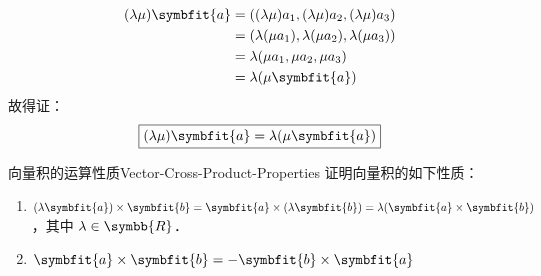 \begin{myproof}

    \begin{equation}
        \begin{aligned}
            (\lambda\mu)\symbfit{a} & = ((\lambda\mu)a_1, (\lambda\mu)a_2, (\lambda\mu)a_3)    \\
                                    & = (\lambda(\mu a_1), \lambda(\mu a_2), \lambda(\mu a_3)) \\
                                    & = \lambda(\mu a_1, \mu a_2, \mu a_3)                     \\
                                    & = \lambda(\mu\symbfit{a})
        \end{aligned}
    \end{equation}
    故得证：
    \begin{equation}
        \boxed{(\lambda\mu)\symbfit{a} = \lambda(\mu\symbfit{a})}
    \end{equation}
\end{myproof}


\begin{problem}{向量积的运算性质}{Vector-Cross-Product-Properties}
    证明向量积的如下性质：
    \begin{enumerate}
        \item $(\lambda\symbfit{a}) \times \symbfit{b} = \symbfit{a} \times (\lambda\symbfit{b}) = \lambda(\symbfit{a} \times \symbfit{b})$，其中 $\lambda \in \symbb{R}$．
        \item $\symbfit{a} \times \symbfit{b} = -\symbfit{b} \times \symbfit{a}$
    \end{enumerate}
\end{problem}

